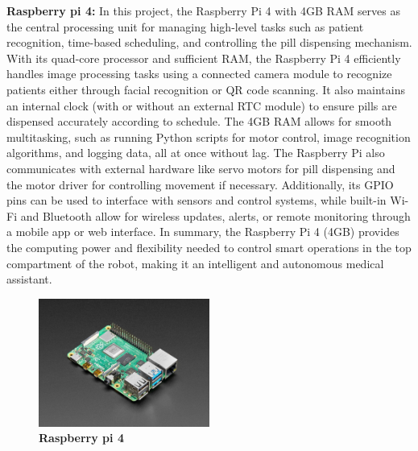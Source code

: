 \textbf{Raspberry pi 4:} In this project, the Raspberry Pi 4 with 4GB RAM serves as the central processing unit for managing high-level tasks such as patient recognition, time-based scheduling, and controlling the pill dispensing mechanism. With its quad-core processor and sufficient RAM, the Raspberry Pi 4 efficiently handles image processing tasks using a connected camera module to recognize patients either through facial recognition or QR code scanning. It also maintains an internal clock (with or without an external RTC module) to ensure pills are dispensed accurately according to schedule. The 4GB RAM allows for smooth multitasking, such as running Python scripts for motor control, image recognition algorithms, and logging data, all at once without lag. The Raspberry Pi also communicates with external hardware like servo motors for pill dispensing and the motor driver for controlling movement if necessary. Additionally, its GPIO pins can be used to interface with sensors and control systems, while built-in Wi-Fi and Bluetooth allow for wireless updates, alerts, or remote monitoring through a mobile app or web interface. In summary, the Raspberry Pi 4 (4GB) provides the computing power and flexibility needed to control smart operations in the top compartment of the robot, making it an intelligent and autonomous medical assistant.

\begin{figure}[htbp!]
\centering
\includegraphics[width=0.5\textwidth]{images/fig3.2.jpg}
\caption{\textbf{Raspberry pi 4}}
\label{fig:3.2}
\end{figure}

\vspace{1.5\baselineskip} %

